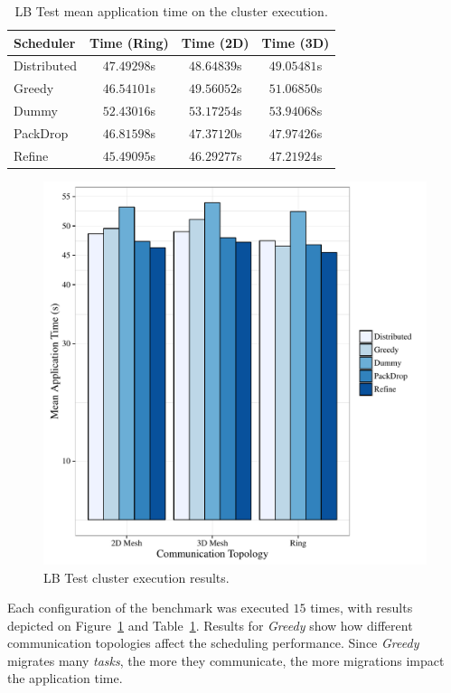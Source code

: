 \begin{table}[t]
	\centering
    \caption{LB Test mean application time on the cluster execution.}
	\begin{tabular}{l | c  c  c}
    	Scheduler & Time (Ring) & Time (2D) & Time (3D) \\ \hline
        Distributed & $47.49298$s & $48.64839$s & $49.05481$s \\
        Greedy & $46.54101$s & $49.56052$s & $51.06850$s \\
        Dummy & $52.43016$s & $53.17254$s & $53.94068$s \\
        PackDrop & $46.81598$s & $47.37120$s & $47.97426$s \\
        Refine & $45.49095$s & $46.29277$s & $47.21924$s \\		
	\end{tabular}
    \label{tab:lbtest:apptime}
\end{table}

\begin{figure}
	\centering
    \includegraphics[width=\linewidth]{images/apptime_lbtest_g5k.pdf}
    \caption{LB Test cluster execution results.}
    \label{fig:eval:g5k:lbtest:apptime}
\end{figure}


Each configuration of the benchmark was executed $15$ times, with results depicted on Figure~\ref{fig:eval:g5k:lbtest:apptime} and Table~\ref{tab:lbtest:apptime}.
Results for \textit{Greedy} show how different communication topologies affect the scheduling performance.
Since \textit{Greedy} migrates many \textit{tasks}, the more they communicate, the more migrations impact the application time.

